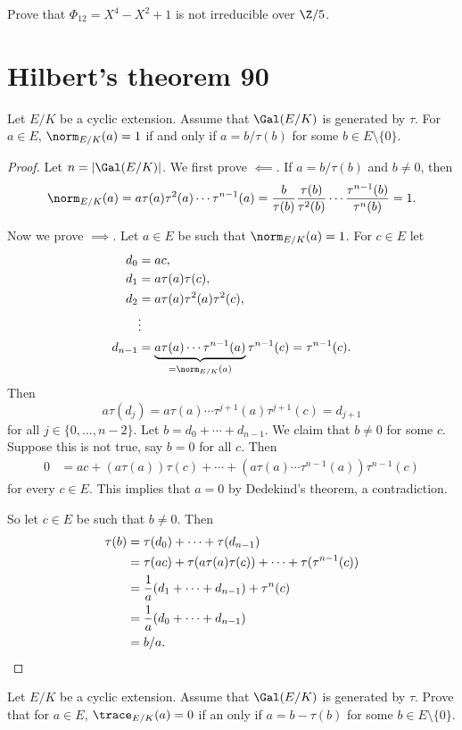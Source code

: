 \begin{exercise}
Prove that
$\Phi_{12}=X^4-X^2+1$ is not irreducible over $\Z/5$. 
\end{exercise}

\section{Hilbert's theorem 90}

\begin{theorem}[Hilbert]
    Let $E/K$ be a cyclic extension. Assume that 
    $\Gal(E/K)$ is generated by $\tau$. For 
    $a\in E$, $\norm_{E/K}(a)=1$ if and only 
    if $a=b/\tau(b)$ for some $b\in E\setminus\{0\}$. 
\end{theorem}

\begin{proof}
    Let $n=|\Gal(E/K)|$. We first prove $\impliedby$. If $a=b/\tau(b)$ and $b\ne 0$, then 
    \[
    \norm_{E/K}(a)=a\tau(a)\tau^2(a)\cdots\tau^{n-1}(a)
    =\frac{b}{\tau(b)}\frac{\tau(b)}{\tau^2(b)}\cdots\frac{\tau^{n-1}(b)}{\tau^n(b)}=1.
    \]

    Now we prove $\implies$. Let $a\in E$ be such that $\norm_{E/K}(a)=1$. For 
    $c\in E$ let 
    \begin{align*}
        d_0 &= ac,\\
        d_1 &= a\tau(a)\tau(c),\\
        d_2 &= a\tau(a)\tau^2(a)\tau^2(c),\\
        &\vdots\\
        d_{n-1} &= \underbrace{a\tau(a)\cdots\tau^{n-1}(a)}_{=\norm_{E/K}(a)}\tau^{n-1}(c)=\tau^{n-1}(c).
    \end{align*}
    Then 
    \[
    a\tau(d_j)=a\tau(a)\cdots\tau^{j+1}(a)\tau^{j+1}(c)=d_{j+1}
    \]
    for all $j\in\{0,\dots,n-2\}$. Let $b=d_0+\cdots+d_{n-1}$. We claim that 
    $b\ne 0$ for some $c$. Suppose this is not true, say $b=0$ for all $c$. Then 
    \begin{align*}
    0&=ac+(a\tau(a))\tau(c)+\cdots+(a\tau(a)\cdots\tau^{n-1}(a))\tau^{n-1}(c)
    \end{align*}
    for every $c\in E$. This 
    implies that $a=0$ by Dedekind's theorem, a contradiction. 
    
    So let $c\in E$ be
    such that $b\ne 0$. Then 
    \begin{align*}
    \tau(b)&=\tau(d_0)+\cdots+\tau(d_{n-1})\\
    &=\tau(ac)+\tau(a\tau(a)\tau(c))+\cdots+\tau(\tau^{n-1}(c))\\
    &=\frac{1}{a}(d_1+\cdots+d_{n-1})+\tau^n(c)\\
    &=\frac{1}{a}(d_0+\cdots+d_{n-1})\\
    &=b/a.\qedhere
    \end{align*}
\end{proof}

\begin{exercise}
    Let $E/K$ be a cyclic extension. Assume that 
    $\Gal(E/K)$ is generated by $\tau$. Prove that for 
    $a\in E$, $\trace_{E/K}(a)=0$ if an only 
    if $a=b-\tau(b)$ for some $b\in E\setminus\{0\}$.  
\end{exercise}
